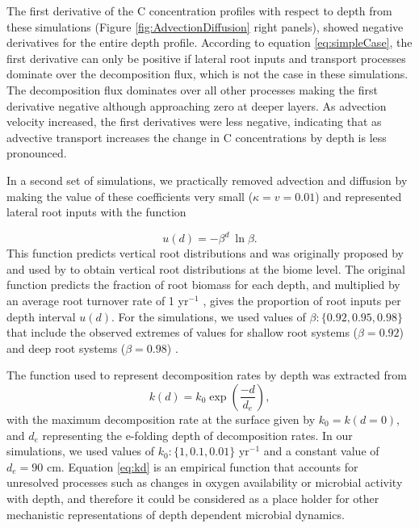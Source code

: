 \documentclass[11pt, oneside, a4paper]{article}   	%
\begin{document}
The first derivative of the C concentration profiles with respect to depth from these simulations (Figure \ref{fig:AdvectionDiffusion} right panels), showed negative derivatives for the entire depth profile. According to equation \ref{eq:simpleCase}, the first derivative can only be positive if lateral root inputs and transport processes dominate over the decomposition flux, which is not the case in these simulations. The decomposition flux dominates over all other processes making the first derivative negative although approaching zero at deeper layers. As advection velocity increased, the first derivatives were less negative, indicating that as advective transport increases the change in C concentrations by depth is less pronounced.

In a second set of simulations, we practically removed advection and diffusion by making the value of these coefficients very small ($\kappa = v =0.01$) and represented lateral root inputs with the function

\begin{equation} \label{eq:ud}
u(d) = - \beta^d \ \ln \beta .
\end{equation}
This function predicts vertical root distributions and was originally proposed by \citet{Gale1987} and used by \citet{Jackson1996, Jackson1997} to obtain vertical root distributions at the biome level. The original function predicts the fraction of root biomass for each depth, and multiplied by an average root turnover rate of 1 yr$^{-1}$ \citep{Gill2000}, gives the proportion of root inputs per depth interval $u(d)$. For the simulations, we used values of $\beta : \{0.92, 0.95, 0.98 \}$ that include the observed extremes of values for shallow root systems ($\beta =0.92$) and deep root systems ($\beta = 0.98$) \citep{Gale1987, Jackson1996}.

The function used to represent decomposition rates by depth was extracted from \citet{Koven2013BGS}
\begin{equation} \label{eq:kd}
k(d) = k_0 \exp \left(\frac{-d}{d_e} \right),
\end{equation}
with the maximum decomposition rate at the surface given by $k_0 = k(d=0)$, and $d_e$ representing the e-folding depth of decomposition rates. In our simulations, we used values of $k_0 : \{1, 0.1, 0.01 \}$ yr$^{-1}$ and a constant value of $d_e = 90$ cm. Equation \ref{eq:kd} is an empirical function that accounts for unresolved processes such as changes in oxygen availability or microbial activity with depth, and therefore it could be considered as a place holder for other mechanistic representations of depth dependent microbial dynamics. 
\end{document}
